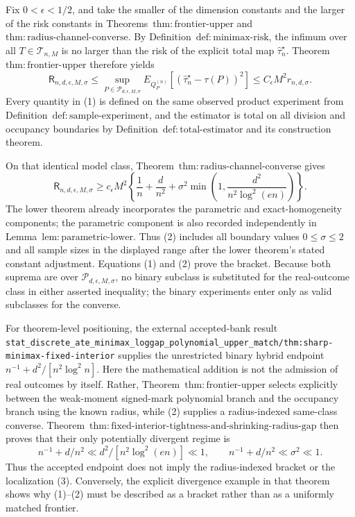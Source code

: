 Fix \(0<\epsilon<1/2\), and take the smaller of the dimension constants and the larger of the risk constants in Theorems~\(\mathrm{thm:frontier\text{-}upper}\) and \(\mathrm{thm:radius\text{-}channel\text{-}converse}\).  By Definition~\(\mathrm{def:minimax\text{-}risk}\), the infimum over all \(T\in\mathcal T_{n,M}\) is no larger than the risk of the explicit total map \(\widehat\tau_n^{\star}\).  Theorem~\(\mathrm{thm:frontier\text{-}upper}\) therefore yields
\[
 \mathsf R_{n,d,\epsilon,M,\sigma}
 \le
 \sup_{P\in\mathcal P_{d,\epsilon,M,\sigma}}
 E_{Q_P^{(n)}}[(\widehat\tau_n^{\star}-\tau(P))^2]
 \le C_{\epsilon}M^2r_{n,d,\sigma}.
\tag{1}
\]
Every quantity in (1) is defined on the same observed product experiment from Definition~\(\mathrm{def:sample\text{-}experiment}\), and the estimator is total on all division and occupancy boundaries by Definition~\(\mathrm{def:total\text{-}estimator}\) and its construction theorem.

On that identical model class, Theorem~\(\mathrm{thm:radius\text{-}channel\text{-}converse}\) gives
\[
 \mathsf R_{n,d,\epsilon,M,\sigma}
 \ge c_{\epsilon}M^2\left\{
 \frac1n+\frac d{n^2}
 +\sigma^2\min\left(1,\frac{d^2}{n^2\log^2(en)}\right)
 \right\}.
\tag{2}
\]
The lower theorem already incorporates the parametric and exact-homogeneity components; the parametric component is also recorded independently in Lemma~\(\mathrm{lem:parametric\text{-}lower}\).  Thus (2) includes all boundary values \(0\le\sigma\le2\) and all sample sizes in the displayed range after the lower theorem's stated constant adjustment.  Equations (1) and (2) prove the bracket.  Because both suprema are over \(\mathcal P_{d,\epsilon,M,\sigma}\), no binary subclass is substituted for the real-outcome class in either asserted inequality; the binary experiments enter only as valid subclasses for the converse.

For theorem-level positioning, the external accepted-bank result \texttt{stat\_discrete\_ate\_minimax\_loggap\_polynomial\_upper\_match/thm:sharp-minimax-fixed-interior} supplies the unrestricted binary hybrid endpoint \(n^{-1}+d^2/[n^2\log^2 n]\).  Here the mathematical addition is not the admission of real outcomes by itself.  Rather, Theorem~\(\mathrm{thm:frontier\text{-}upper}\) selects explicitly between the weak-moment signed-mark polynomial branch and the occupancy branch using the known radius, while (2) supplies a radius-indexed same-class converse.  Theorem~\(\mathrm{thm:fixed\text{-}interior\text{-}tightness\text{-}and\text{-}shrinking\text{-}radius\text{-}gap}\) then proves that their only potentially divergent regime is
\[
 n^{-1}+d/n^2\ll d^2/[n^2\log^2(en)]\ll1,
 \qquad
 n^{-1}+d/n^2\ll\sigma^2\ll1.
\tag{3}
\]
Thus the accepted endpoint does not imply the radius-indexed bracket or the localization (3).  Conversely, the explicit divergence example in that theorem shows why (1)--(2) must be described as a bracket rather than as a uniformly matched frontier.